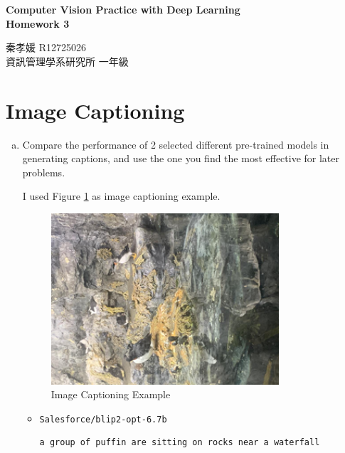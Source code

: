 \documentclass[10pt,a4paper]{article}
\begin{document}
\title{}
\author{}


\begin{center}
\textbf{\Large Computer Vision Practice with Deep Learning \\[5pt]
Homework 3}

秦孝媛 R12725026 \\
資訊管理學系研究所 一年級
\end{center}
\section*{Image Captioning}
\begin{enumerate}[(a)]
\item Compare the performance of 2 selected different pre-trained models in
generating captions, and use the one you find the most effective for later
problems.

I used Figure \ref{fig:IMG_8531} as image captioning example.

\begin{figure}[hbt]
\centering
\includegraphics[width=0.8\textwidth]{figure/IMG_8531_jpg.rf.abe45b49de6d004d043f2e5bda2763bd.png}
\caption{Image Captioning Example}
\label{fig:IMG_8531}
\end{figure}

\begin{itemize}
\item \verb|Salesforce/blip2-opt-6.7b|
\begin{lstlisting}[frame=single]
a group of puffin are sitting on rocks near a waterfall
\end{lstlisting}


\end{itemize}
\end{enumerate}
\end{document}
